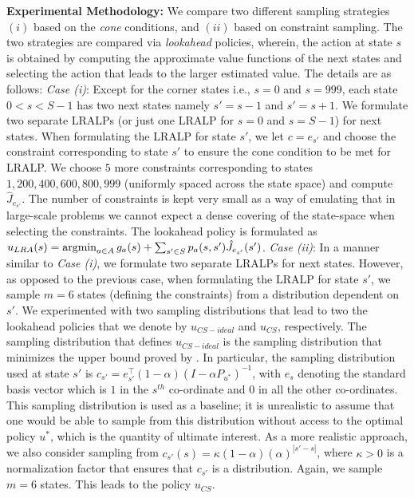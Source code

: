 \documentclass[12pt,draftcls,onecolumn]{IEEEtran}
\begin{document}
\textbf{Experimental Methodology:} We compare two different sampling strategies $(i)$ based on the \emph{cone} conditions, and $(ii)$ based on constraint sampling. The two strategies are compared via  \emph{lookahead} policies, wherein, the action at state $s$ is obtained by computing the approximate value functions of the next states and selecting the action that leads to the larger estimated value. The details are as follows:
%
\emph{Case (i)}: Except for the corner states i.e., $s=0$ and $s=999$, each state $0<s<S-1$ has two next states namely $s'=s-1$ and $s'=s+1$. We formulate two separate LRALPs (or just one LRALP for $s=0$ and $s=S-1$) for next states. When formulating the LRALP for state $s'$, we let $c=e_{s'}$ and choose the constraint corresponding to state $s'$ to ensure the cone condition to be met for LRALP. We choose $5$ more constraints corresponding to states $1,200,400,600,800,999$ (uniformly spaced across the state space) and compute $\hat{J}_{e_{s'}}$. 
The number of constraints is kept very small as a way of emulating that in large-scale problems we cannot expect a dense covering of the state-space when selecting the constraints.
The lookahead policy is formulated as
$u_{LRA}(s)=\operatorname{argmin}_{a\in A} g_a(s)+\sum_{s'\in S}p_a(s,s')\hat{J}_{e_{s'}}(s')$.  
%
\emph{Case (ii)}: In a manner similar to \emph{Case (i)}, we formulate two separate LRALPs for next states. However, as opposed to the previous case, when formulating the LRALP for state $s'$, we sample $m=6$ states (defining the constraints) from a distribution dependent on $s'$.
We experimented with two sampling distributions that lead to two the lookahead policies that we denote by $u_{CS-ideal}$ and $u_{CS}$, respectively.
The sampling distribution that defines $u_{CS-ideal}$ 
is the sampling distribution that minimizes the upper bound proved by \citet{CS}.
In particular, the sampling distribution used at state $s'$ is
$c_{s'}=e^\top_{s'}(1-\alpha)(I-\alpha P_{u^*})^{-1}$, with $e_s$ denoting the standard basis vector which is $1$ in the $s^{th}$ co-ordinate and $0$ in all the other co-ordinates. This sampling distribution is used as a baseline; it is unrealistic to assume that one would be able to sample from this distribution without access to the optimal policy $u^*$, which is the quantity of ultimate interest.
As a more realistic approach, we also consider sampling from 
$c_{s'}(s)=\kappa (1-\alpha)(\alpha)^{|s'-s|}$, 
where $\kappa>0$ is a normalization factor that ensures that $c_{s'}$ is a distribution.
Again, we sample  $m=6$ states. This leads to the policy $u_{CS}$. 
\end{document}
